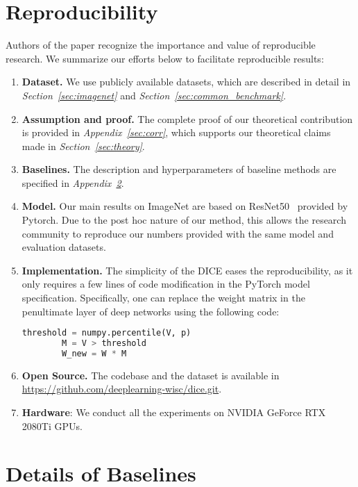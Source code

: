 \documentclass[runningheads]{llncs}
\begin{document}
\section{Reproducibility}
    \label{sec:reproduce}
 Authors of the paper recognize the importance and value of reproducible research. 
 We summarize our efforts below to facilitate reproducible results: 
 \begin{enumerate}
     \item \textbf{Dataset.} We use {publicly available} datasets, which are described in detail in   \emph{Section~\ref{sec:imagenet}} and \emph{Section~\ref{sec:common_benchmark}}. 
\item \textbf{Assumption and proof.} The complete proof of our theoretical contribution is provided in \emph{Appendix~\ref{sec:corr}}, which supports our theoretical claims made in \emph{Section~\ref{sec:theory}}.
     \item \textbf{Baselines.} The description and hyperparameters of baseline methods are specified in \emph{Appendix~\ref{sec:baseline}}.
     \item \textbf{Model.} Our main results on ImageNet are based on ResNet50~\cite{he2016identity} provided by Pytorch. Due to the post hoc nature of our method, this allows the research community to reproduce our numbers provided with the same model and evaluation datasets. 
     \item  \textbf{Implementation.} The simplicity of the DICE eases the reproducibility, as it only requires a few lines of code modification in the PyTorch model specification. Specifically, one can replace the weight matrix in the penultimate layer of deep networks using the following code:
\begin{lstlisting}[language=Python]
        threshold = numpy.percentile(V, p)
        M = V > threshold
        W_new = W * M
\end{lstlisting}
    \item  \textbf{Open Source.}  The codebase and the dataset is available in  \url{https://github.com/deeplearning-wisc/dice.git}.
    \item \textbf{Hardware}: We conduct all the experiments on NVIDIA GeForce RTX 2080Ti GPUs.
 \end{enumerate}


\section{Details of Baselines}
\label{sec:baseline}
\end{document}
